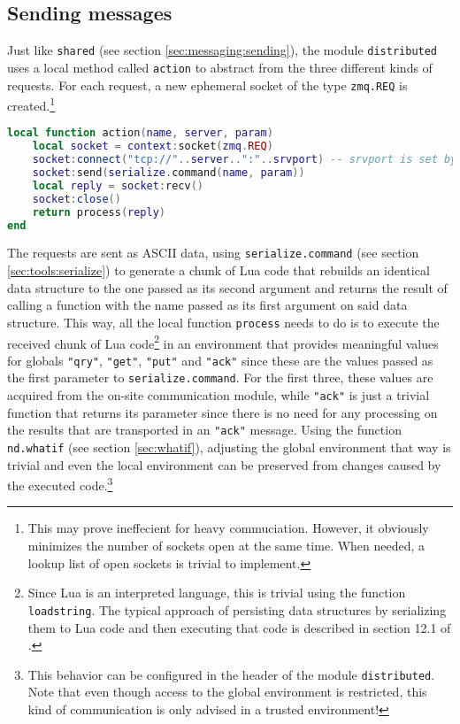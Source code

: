 \subsection{Sending messages}

Just like \texttt{shared} (see section \ref{sec:messaging:sending}), the module \texttt{distributed} uses a local method called \texttt{action} to abstract from the three different kinds of requests. For each request, a new ephemeral socket of the type \texttt{zmq.REQ} is created.\footnote{This may prove ineffecient for heavy commuciation. However, it obviously minimizes the number of sockets open at the same time. When needed, a lookup list of open sockets is trivial to implement.}

\begin{lstlisting}[language=lua, caption={The local function \texttt{action} of the module \texttt{distributed}}, label=lst:distributedaction, name=lst:distributedaction]
local function action(name, server, param)
	local socket = context:socket(zmq.REQ)
	socket:connect("tcp://"..server..":"..srvport) -- srvport is set by distributed.init
	socket:send(serialize.command(name, param))
	local reply = socket:recv()
	socket:close()
	return process(reply)
end
\end{lstlisting}

The requests are sent as ASCII data, using \texttt{serialize.command} (see section \ref{sec:tools:serialize}) to generate a chunk of Lua code that rebuilds an identical data structure to the one passed as its second argument and returns the result of calling a function with the name passed as its first argument on said data structure. This way, all the local function \texttt{process} needs to do is to execute the received chunk of Lua code\footnote{Since Lua is an interpreted language, this is trivial using the function \texttt{loadstring}. The typical approach of persisting data structures by serializing them to Lua code and then executing that code is described in section 12.1 of \cite{Ierusalimschy2006}.} in an environment that provides meaningful values for globals \texttt{"qry"}, \texttt{"get"}, \texttt{"put"} and \texttt{"ack"} since these are the values passed as the first parameter to \texttt{serialize.command}. For the first three, these values are acquired from the on-site communication module, while \texttt{"ack"} is just a trivial function that returns its parameter since there is no need for any processing on the results that are transported in an \texttt{"ack"} message. Using the function \texttt{nd.whatif} (see section \ref{sec:whatif}), adjusting the global environment that way is trivial and even the local environment can be preserved from changes caused by the executed code.\footnote{This behavior can be configured in the header of the module \texttt{distributed}. Note that even though access to the global environment is restricted, this kind of communication is only advised in a trusted environment!}

